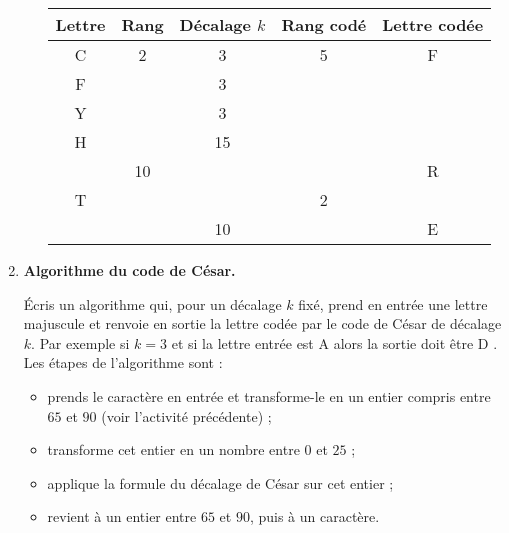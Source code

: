 \documentclass[class=report,crop=false, 12pt]{standalone}
\begin{document}
\begin{activite}[Modulo]
\begin{enumerate}
\begin{enumerate}
\begin{center}
\begin{tabular}{|c|c|c|c|c|}
\hline
Lettre & Rang & Décalage $k$ & Rang codé & Lettre codée \\ \hline\hline
C & 2 & 3  & 5 & F \\ \hline
F &   & 3  &   &   \\ \hline
Y &   & 3  &   &   \\ \hline
H &   & 15 &   &   \\ \hline
  & 10&    &   & R \\ \hline
T &   &    & 2 &  \\ \hline
  &   & 10   &   & E \\ \hline  
\end{tabular}
\end{center}
     
  \end{enumerate}  
   
   \item \textbf{Algorithme du code de César.}
   
   \'Ecris un algorithme qui, pour un décalage $k$ fixé, prend en entrée une lettre majuscule et renvoie en sortie la lettre codée par le code de César de décalage $k$.
   Par exemple si $k=3$ et si la lettre entrée est \og A \fg{} alors la sortie doit être \og D \fg{}.
   Les étapes de l'algorithme sont :
   \begin{itemize} 
     \item prends le caractère en entrée et transforme-le en un entier compris entre $65$ et $90$ (voir l'activité précédente) ;
     \item transforme cet entier en un nombre entre $0$ et $25$ ;
     \item applique la formule du décalage de César sur cet entier ;
     \item revient à un entier entre $65$ et $90$, puis à un caractère.
   \end{itemize}    
   
   
\end{enumerate}

\end{activite}
\end{document}
